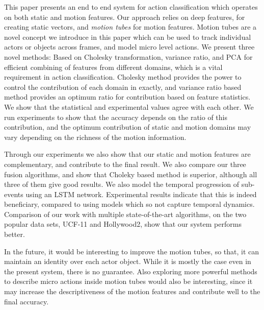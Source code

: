 This paper presents an end to end system for action classification which operates
on both static and motion features. Our approach relies on deep features,
for creating static vectors, and \textit{motion tubes} for motion features.
Motion tubes are a novel concept we introduce in this paper which can be
used to track individual actors or objects across frames, and model micro level actions.
We present three novel methods: Based on Cholesky transformation, variance ratio, and PCA for efficient combining of features
from different domains, which is a vital requirement in action classification.
Cholesky method provides the power to control the contribution of each domain in exactly, and
variance ratio based method  provides an optimum ratio for contribution based on feature statistics. We show that the statistical
and experimental values agree with each other. We run experiments to show that the accuracy depends on the ratio of this contribution, and the optimum contribution of
static and motion domains may vary depending on the richness of the motion information.

Through our experiments we also show that our static and motion features are complementary,
and contribute to the final result. We also compare our three fusion algorithms, and
show that Choleky based method is superior, although all three of them give good results. We also model the temporal progression of sub-events using an LSTM network. Experimental
results indicate that this is indeed beneficiary, compared to using models which so not capture temporal dynamics. Comparison of our work with multiple state-of-the-art algorithms, on the two popular data sets, UCF-11 and Hollywood2, show that our system performs better.


In the future, it would be interesting to improve the motion tubes, so that, it can maintain an identity over each actor object.
While it is mostly the case even in the present system, there is no guarantee.
Also exploring more powerful methods to describe micro actions inside motion tubes would also be interesting, since it may increase the descriptiveness of the motion features and
contribute well to the final accuracy.
